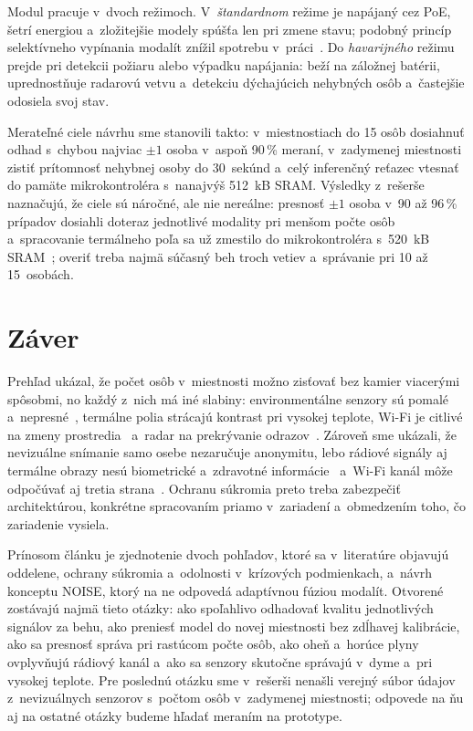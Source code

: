 \documentclass[10pt,twoside,a4paper]{article}
\begin{document}
Modul pracuje v~dvoch režimoch. V~\emph{štandardnom} režime je napájaný cez PoE, šetrí energiou a~zložitejšie modely spúšťa len pri zmene stavu; podobný princíp selektívneho vypínania modalít znížil spotrebu v~práci~\cite{cui2026em2}. Do \emph{havarijného} režimu prejde pri detekcii požiaru alebo výpadku napájania: beží na záložnej batérii, uprednostňuje radarovú vetvu a~detekciu dýchajúcich nehybných osôb a~častejšie odosiela svoj stav.

Merateľné ciele návrhu sme stanovili takto: v~miestnostiach do 15 osôb dosiahnuť odhad s~chybou najviac $\pm 1$ osoba v~aspoň 90\,\% meraní, v~zadymenej miestnosti zistiť prítomnosť nehybnej osoby do 30~sekúnd a~celý inferenčný reťazec vtesnať do pamäte mikrokontroléra s~nanajvýš 512~kB SRAM. Výsledky z~rešerše naznačujú, že ciele sú náročné, ale nie nereálne: presnosť $\pm 1$ osoba v~90 až 96\,\% prípadov dosiahli doteraz jednotlivé modality pri menšom počte osôb~\cite{korany2021stationary} a~spracovanie termálneho poľa sa už zmestilo do mikrokontroléra s~520~kB SRAM~\cite{papanashi2026thermal}; overiť treba najmä súčasný beh troch vetiev a~správanie pri 10 až 15~osobách.

\section{Záver}\label{zaver}

Prehľad ukázal, že počet osôb v~miestnosti možno zisťovať bez kamier viacerými spôsobmi, no každý z~nich má iné slabiny: environmentálne senzory sú pomalé a~nepresné~\cite{chitnis2025environmental}, termálne polia strácajú kontrast pri vysokej teplote, Wi-Fi je citlivé na zmeny prostredia~\cite{santos2024environment} a~radar na prekrývanie odrazov~\cite{ren2023grouped}. Zároveň sme ukázali, že nevizuálne snímanie samo osebe nezaručuje anonymitu, lebo rádiové signály aj termálne obrazy nesú biometrické a~zdravotné informácie~\cite{wang2016gait,zhao2019mid,adib2015vital,yang2020muid,jiang2026warmgait} a~Wi-Fi kanál môže odpočúvať aj tretia strana~\cite{hernandez2021adversarial,xiao2025leakybeam}. Ochranu súkromia preto treba zabezpečiť architektúrou, konkrétne spracovaním priamo v~zariadení a~obmedzením toho, čo zariadenie vysiela.

Prínosom článku je zjednotenie dvoch pohľadov, ktoré sa v~literatúre objavujú oddelene, ochrany súkromia a~odolnosti v~krízových podmienkach, a~návrh konceptu NOISE, ktorý na ne odpovedá adaptívnou fúziou modalít. Otvorené zostávajú najmä tieto otázky: ako spoľahlivo odhadovať kvalitu jednotlivých signálov za behu, ako preniesť model do novej miestnosti bez zdĺhavej kalibrácie, ako sa presnosť správa pri rastúcom počte osôb, ako oheň a~horúce plyny ovplyvňujú rádiový kanál a~ako sa senzory skutočne správajú v~dyme a~pri vysokej teplote. Pre poslednú otázku sme v~rešerši nenašli verejný súbor údajov z~nevizuálnych senzorov s~počtom osôb v~zadymenej miestnosti; odpovede na ňu aj na ostatné otázky budeme hľadať meraním na prototype.



\end{document}
